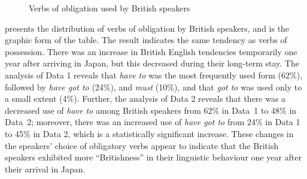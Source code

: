 \documentclass[output=paper,colorlinks,citecolor=brown]{langscibook}
\begin{document}
\begin{figure}
\caption{\label{fig:hirano:2}Verbs of obligation used by British speakers}
\end{figure}

 presents the distribution of verbs of obligation by British speakers, and  is the graphic form of the table. The result indicates the same tendency as verbs of possession. There was an increase in British English tendencies temporarily one year after arriving in Japan, but this decreased during their long-term stay. The analysis of Data 1 reveals that \textit{have to} was the most frequently used form (62\%), followed by \textit{have got to} (24\%), and \textit{must} (10\%), and that \textit{got to} was used only to a small extent (4\%). Further, the analysis of Data 2 reveals that there was a decreased use of \textit{have to} among British speakers from 62\% in Data~1 to 48\% in Data~2; moreover, there was an increased use of \textit{have got to} from 24\% in Data 1 to 45\% in Data 2, which is a statistically significant increase. These changes in the speakers’ choice of obligatory verbs appear to indicate that the British speakers exhibited more “Britishness” in their linguistic behaviour one year after their arrival in Japan.
\end{document}
